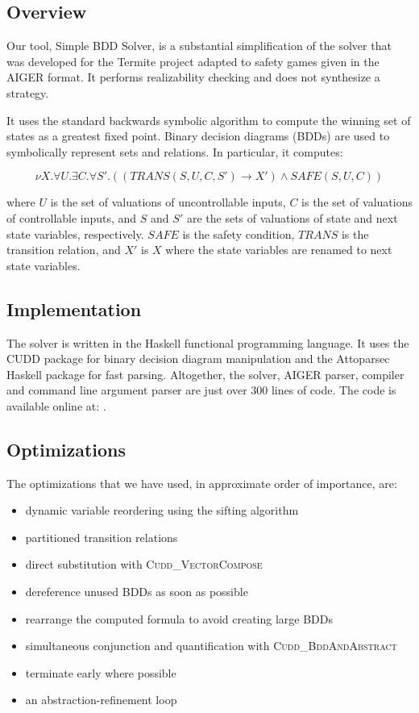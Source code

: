 \subsection{Overview}
Our tool, Simple BDD Solver, is a substantial simplification of the solver that was developed for the Termite project adapted to safety games given in the AIGER format. 
It performs realizability checking and does not synthesize a strategy.

It uses the standard backwards symbolic algorithm to compute the winning set of states as a greatest fixed point. Binary decision diagrams (BDDs) are used to symbolically represent sets and relations. In particular, it computes:

\begin{equation}
\label{eqn:mu}
\nu X. \forall U. \exists C. \forall S'. ((TRANS(S, U, C, S') \rightarrow X') \wedge SAFE(S, U, C))
\end{equation}

\noindent where $U$ is the set of valuations of uncontrollable inputs, $C$ is the set of valuations of controllable inputs, and $S$ and $S'$ are the sets of valuations of state and next state variables, respectively. $SAFE$ is the safety condition, $TRANS$ is the transition relation, and $X'$ is $X$ where the state variables are renamed to next state variables.

\subsection{Implementation}
The solver is written in the Haskell functional programming language. It uses the CUDD \cite{cudd} package for binary decision diagram manipulation and the Attoparsec \cite{attoparsec} Haskell package for fast parsing. Altogether, the solver, AIGER parser, compiler and command line argument parser are just over 300 lines of code. The code is available online at: .

\subsection{Optimizations}
\label{sec:syntcomp_optimisations}

The optimizations that we have used, in approximate order of importance, are:
\begin{itemize}
    \item dynamic variable reordering using the sifting algorithm \cite{sifting}
    \item partitioned transition relations \cite{partitioned}
    \item direct substitution with \textsc{Cudd\_VectorCompose}
    \item dereference unused BDDs as soon as possible
    \item rearrange the computed formula to avoid creating large BDDs
    \item simultaneous conjunction and quantification with \textsc{Cudd\_BddAndAbstract}
    \item terminate early where possible
    \item an abstraction-refinement loop
\end{itemize}

